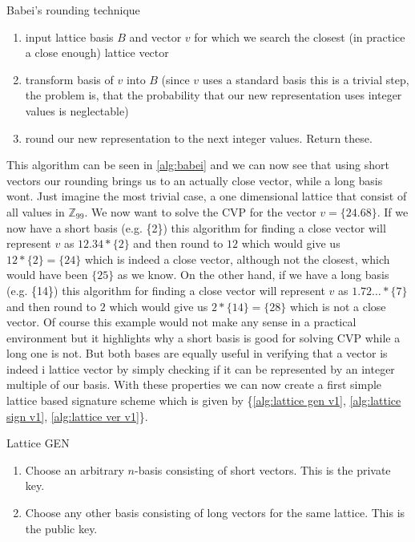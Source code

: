 \documentclass[conference]{IEEEtran}
\begin{document}
\begin{algorithm}
    \caption{Babei's rounding technique}\label{alg:babei}
        \begin{enumerate}
            \item input lattice basis $B$ and vector $v$ for which we search the closest (in practice a close enough) lattice vector
            \item transform basis of $v$ into $B$ (since $v$ uses a standard basis this is a trivial step, the problem is, that the probability that our new representation uses integer values is neglectable)
            \item round our new representation to the next integer values. Return these.
        \end{enumerate}
    \end{algorithm}

This algorithm can be seen in \ref{alg:babei} and we can now see that using short vectors our rounding brings us to an actually close vector, while a long basis wont.
Just imagine the most trivial case, a one dimensional lattice that consist of all values in $\mathbb{Z}_99$. We now want to solve the CVP for the vector $v= \{24.68\}$.
If we now have a short basis (e.g. \{2\}) this algorithm for finding a close vector will represent $v$ as $12.34*\{2\}$ and then round to $12$ which would give us $12*\{2\}=\{24\}$ which is indeed a close vector, although not the closest, which would have been $\{25\}$ as we know.
On the other hand, if we have a long basis (e.g. \{14\}) this algorithm for finding a close vector will represent $v$ as $1.72\dots*\{7\}$ and then round to $2$ which would give us $2*\{14\}=\{28\}$ which is not a close vector.
Of course this example would not make any sense in a practical environment but it highlights why a short basis is good for solving CVP while a long one is not.
But both bases are equally useful in verifying that a vector is indeed i lattice vector by simply checking if it can be represented by an integer multiple of our basis.
With these properties we can now create a first simple lattice based signature scheme which is given by \{\ref{alg:lattice gen v1}, \ref{alg:lattice sign v1}, \ref{alg:lattice ver v1}\}.

\begin{algorithm}
    \caption{Lattice GEN}\label{alg:lattice gen v1}
        \begin{enumerate}
            \item Choose an arbitrary $n$-basis consisting of short vectors. This is the private key.
            \item Choose any other basis consisting of long vectors for the same lattice. This is the public key. %
        \end{enumerate}
    \end{algorithm}
\end{document}
